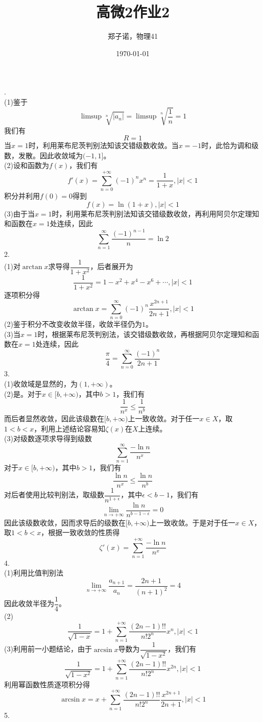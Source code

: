 \documentclass[utf8]{ctexart}
\title{高微2作业2}
\author{郑子诺，物理41}
\date{\today}
\begin{document}
\maketitle
{}.\\
(1)鉴于
\[\limsup\sqrt[n]{|a_n|}=\limsup\sqrt[n]{\frac{1}{n}}=1\]
我们有
\[R=1\]
当$x=1$时，利用莱布尼茨判别法知该交错级数收敛。当$x=-1$时，此恰为调和级数，发散。因此收敛域为$(-1,1]$。\\
(2)设和函数为$f(x)$，我们有
\[f'(x)=\sum_{n=0}^{+\infty}(-1)^nx^n=\frac{1}{1+x},|x|<1\]
积分并利用$f(0)=0$得到
\[f(x)=\ln(1+x),|x|<1\]
(3)由于当$x=1$时，利用莱布尼茨判别法知该交错级数收敛，再利用阿贝尔定理知和函数在$x=1$处连续，因此
\[\sum_{n=1}^{\infty}\frac{(-1)^{n-1}}{n}=\ln 2\]
2.\\
(1)对$\arctan x$求导得$\dfrac{1}{1+x^2}$，后者展开为
\[\frac{1}{1+x^2}=1-x^2+x^4-x^6+\cdots,|x|<1\]
逐项积分得
\[\arctan x=\sum_{n=0}^{\infty}(-1)^n\frac{x^{2n+1}}{2n+1},|x|<1\]
(2)鉴于积分不改变收敛半径，收敛半径仍为$1$。\\
(3)当$x=1$时，根据莱布尼茨判别法，该交错级数收敛，再根据阿贝尔定理知和函数在$x=1$处连续，因此
\[\frac{\pi}{4}=\sum_{n=0}^{\infty}\frac{(-1)^n}{2n+1}\]
3.\\
(1)收敛域是显然的，为$(1,+\infty)$。\\
(2)是。对于$x\in[b,+\infty)$，其中$b>1$，我们有
\[\frac{1}{n^x}\le\frac{1}{n^b}\]
而后者显然收敛，因此该级数在$[b,+\infty)$上一致收敛。对于任一$x\in X$，取$1<b<x$，利用上述结论容易知$\zeta(x)$在$X$上连续。\\
(3)对级数逐项求导得到级数
\[\sum_{n=1}^{\infty}\frac{-\ln n}{n^x}\]
对于$x\in[b,+\infty)$，其中$b>1$，我们有
\[\frac{\ln n}{n^x}\le\frac{\ln n}{n^b}\]
对后者使用比较判别法，取级数$\dfrac{1}{n^{1+\epsilon}}$，其中$\epsilon<b-1$，我们有
\[\lim_{n\rightarrow+\infty}\frac{\ln n}{n^{b-1-\epsilon}}=0\]
因此该级数收敛，因而求导后的级数在$[b,+\infty)$上一致收敛。于是对于任一$x\in X$，取$1<b<x$，根据一致收敛的性质得
\[\zeta'(x)=\sum_{n=1}^{+\infty}\frac{-\ln n}{n^x}\]
4.\\
(1)利用比值判别法
\[\lim_{n\rightarrow+\infty}\frac{a_{n+1}}{a_n}=\frac{2n+1}{(n+1)^2}=4\]
因此收敛半径为$\dfrac{1}{4}$。\\
(2)
\[\frac{1}{\sqrt{1-x}}=1+\sum_{n=1}^{+\infty}\frac{(2n-1)!!}{n!2^n}x^n,|x|<1\]
(3)利用前一小题结论，由于$\arcsin x$导数为$\dfrac{1}{\sqrt{1-x^2}}$，我们有
\[\frac{1}{\sqrt{1-x^2}}=1+\sum_{n=1}^{+\infty}\frac{(2n-1)!!}{n!2^n}x^{2n},|x|<1\]
利用幂函数性质逐项积分得
\[\arcsin x=x+\sum_{n=1}^{+\infty}\frac{(2n-1)!!}{n!2^n}\frac{x^{2n+1}}{2n+1},|x|<1\]
5.\\
\end{document}
